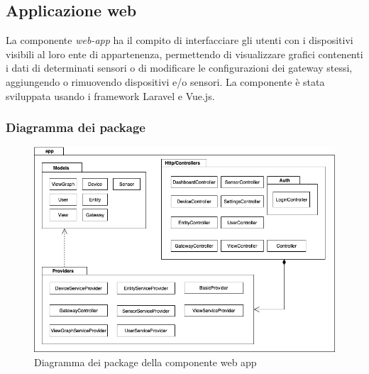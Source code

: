 \subsection{Applicazione web}
La componente \textit{web-app} ha il compito di interfacciare gli utenti con i dispositivi visibili al loro ente di appartenenza, permettendo di visualizzare grafici contenenti i dati di determinati sensori o di modificare le configurazioni dei gateway stessi, aggiungendo o rimuovendo dispositivi e/o sensori. 
La componente è stata sviluppata usando i framework Laravel e Vue.js.

	\subsubsection{Diagramma dei package}%
		\begin{figure}[H]
			\centering
			\includegraphics[scale=0.600]{res/images/WEBAPP/WebAppPackage.png}
			\caption{Diagramma dei package della componente web app}
			\label{Diagramma 21}
		\end{figure}

